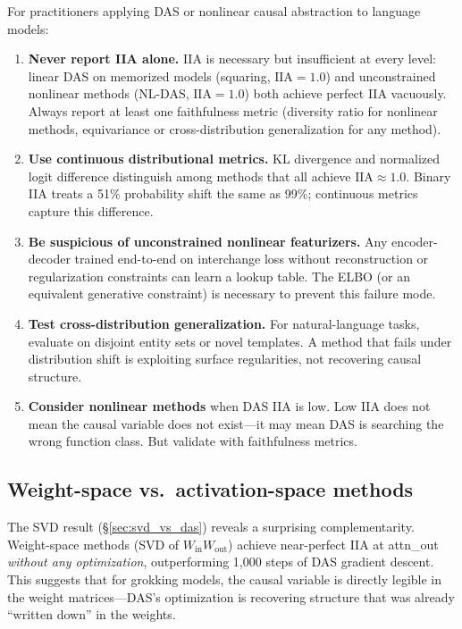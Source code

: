 \documentclass{article}
\newcommand{\IIA}{\mathrm{IIA}}
\begin{document}
For practitioners applying DAS or nonlinear causal abstraction to language
models:
\begin{enumerate}
\item \textbf{Never report IIA alone.} IIA is necessary but insufficient at
  every level: linear DAS on memorized models (squaring, $\IIA = 1.0$) and
  unconstrained nonlinear methods (NL-DAS, $\IIA = 1.0$) both achieve
  perfect IIA vacuously. Always report at least one faithfulness metric
  (diversity ratio for nonlinear methods, equivariance or cross-distribution
  generalization for any method).
\item \textbf{Use continuous distributional metrics.} KL divergence and
  normalized logit difference distinguish among methods that all achieve
  $\IIA \approx 1.0$. Binary IIA treats a 51\% probability shift the same as
  99\%; continuous metrics capture this difference.
\item \textbf{Be suspicious of unconstrained nonlinear featurizers.} Any
  encoder-decoder trained end-to-end on interchange loss without reconstruction
  or regularization constraints can learn a lookup table. The ELBO
  (or an equivalent generative constraint) is necessary to prevent this
  failure mode.
\item \textbf{Test cross-distribution generalization.} For natural-language
  tasks, evaluate on disjoint entity sets or novel templates. A method that
  fails under distribution shift is exploiting surface regularities, not
  recovering causal structure.
\item \textbf{Consider nonlinear methods} when DAS IIA is low. Low IIA does not
  mean the causal variable does not exist---it may mean DAS is searching the
  wrong function class. But validate with faithfulness metrics.
\end{enumerate}

\subsection{Weight-space vs.\ activation-space methods}

The SVD result (\S\ref{sec:svd_vs_das}) reveals a surprising complementarity.
Weight-space methods (SVD of $W_\text{in} W_\text{out}$) achieve near-perfect
IIA at attn\_out \emph{without any optimization}, outperforming 1{,}000 steps
of DAS gradient descent. This suggests that for grokking models, the causal
variable is directly legible in the weight matrices---DAS's optimization
is recovering structure that was already ``written down'' in the weights.
\end{document}
